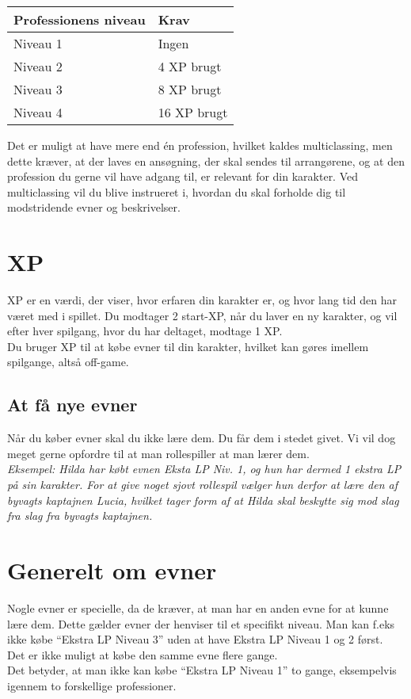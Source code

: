 \begin{table}[!htbp]
    \centering
    \begin{tabular}{|p{}|p{}|}
    \rowcolor{cerulean!80}\hline
        Professionens niveau & Krav \\\hline

        Niveau 1 & Ingen \\\hline
        Niveau 2 & 4 XP brugt \\\hline
        Niveau 3 & 8 XP brugt \\\hline
        Niveau 4 & 16 XP brugt \\\hline
    \end{tabular}
\end{table}

Det er muligt at have mere end én profession, hvilket kaldes multiclassing, men dette kræver, at der laves en ansøgning, der skal sendes til arrangørene, og at den profession du gerne vil have adgang til, er relevant for din karakter.
Ved multiclassing vil du blive instrueret i, hvordan du skal forholde dig til modstridende evner og beskrivelser.


\section{XP}
XP er en værdi, der viser, hvor erfaren din karakter er, og hvor lang tid den har været med i spillet. Du modtager 2 start-XP, når du laver en ny karakter, og vil efter hver spilgang, hvor du har deltaget, modtage 1 XP.\\ 
Du bruger XP til at købe evner til din karakter, hvilket kan gøres imellem spilgange, altså off-game.

\subsection{At få nye evner}
Når du køber evner skal du ikke lære dem. Du får dem i stedet givet. Vi vil dog meget gerne opfordre til at man rollespiller at man lærer dem.\\
\textit{Eksempel: Hilda har købt evnen Eksta LP Niv. 1, og hun har dermed 1 ekstra LP på sin karakter. For at give noget sjovt rollespil vælger hun derfor at lære den af byvagts kaptajnen Lucia, hvilket tager form af at Hilda skal beskytte sig mod slag fra slag fra byvagts kaptajnen.}\\

\section{Generelt om evner}
Nogle evner er specielle, da de kræver, at man har en anden evne for at kunne lære dem. Dette gælder evner der henviser til et specifikt niveau. Man kan f.eks ikke købe “Ekstra LP Niveau 3” uden at have Ekstra LP Niveau 1 og 2 først.\\
Det er ikke muligt at købe den samme evne flere gange.\\
Det betyder, at man ikke kan købe “Ekstra LP Niveau 1” to gange, eksempelvis igennem to forskellige professioner.

